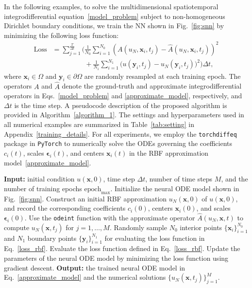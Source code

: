 In the following examples, to solve the multidimensional spatiotemporal integrodifferential equation~\eqref{model_problem} subject to non-homogeneous Dirichlet boundary conditions, we train the NN shown in Fig.~\ref{fig:snn} by minimizing the following loss function:
\begin{equation}
\begin{aligned}
    \text{Loss} &= \sum_{j=1}^{\frac{T}{\Delta t}}\bigg(\frac{1}{N_0}\sum_{i=1}^{N_0} (A(u_N, \bm x_i, t_j) - \hat{A}(u_N, \bm x_i, t_j))^2\\
    &\hspace{2cm}+\frac{1}{N_1}\sum_{i=1}^{N_1} \big(u(\bm y_i, t_j) - u_N(\bm y_i, t_j))^2\bigg)\Delta t,
    \end{aligned}
    \label{loss_rbf}
\end{equation}
where $\bm{x}_i \in \Omega$ and $\bm{y}_i \in \partial \Omega$ are randomly resampled at each training epoch. The operators $A$ and $\hat{A}$ denote the ground-truth and approximate integrodifferential operators in Eqs.~\eqref{model_problem} and \eqref{approximate_model}, respectively, and $\Delta t$ is the time step. A pseudocode description of the proposed algorithm is provided in Algorithm~\ref{algorithm_1}. The settings and hyperparameters used in all numerical examples are summarized in Table~\ref{tab:setting} in Appendix~\ref{training_details}. For all experiments, we employ the \texttt{torchdiffeq} package in \texttt{PyTorch} \cite{chen2018neural} to numerically solve the ODEs governing the coefficients $c_i(t)$, scales $\bm{\epsilon}_i(t)$, and centers $\bm{x}_i(t)$ in the RBF approximation model~\eqref{approximate_model}.

\begin{algorithm}
\footnotesize
\caption{\footnotesize Pseudocode of the adaptive RBF approach for numerically solving multidimensional spatiotemporal equations.}
\begin{algorithmic}
  \STATE \textbf{Input:} initial condition $u(\bm{x},0)$, time step $\Delta t$, number of time steps $M$, and the number of training epochs $\text{epoch}_{\max}$.
  \STATE Initialize the neural ODE model shown in Fig.~\ref{fig:snn}.
  \STATE Construct an initial RBF approximation $u_N(\bm{x},0)$ of $u(\bm{x},0)$, and record the corresponding coefficients $c_i(0)$, centers $\bm{x}_i(0)$, and scales $\bm{\epsilon}_i(0)$.
    \STATE Use the \texttt{odeint} function with the approximate operator $\hat{A}(u_N,\bm{x},t)$ to compute $u_N(\bm{x},t_j)$ for $j = 1,\ldots,M$.
    \STATE Randomly sample $N_0$ interior points $\{\bm{x}_i\}_{i=1}^{N_0}$ and $N_1$ boundary points $\{\bm{y}_i\}_{i=1}^{N_1}$ for evaluating the loss function in Eq.~\eqref{loss_rbf}.
    \STATE Evaluate the loss function defined in Eq.~\eqref{loss_rbf}.
    \STATE Update the parameters of the neural ODE model by minimizing the loss function using gradient descent.
  \ENDFOR
  \STATE \textbf{Output:} the trained neural ODE model in Eq.~\eqref{approximate_model} and the numerical solutions $\{u_N(\bm{x},t_j)\}_{j=1}^{M}$.
\end{algorithmic}
\label{algorithm_1}
\end{algorithm}


